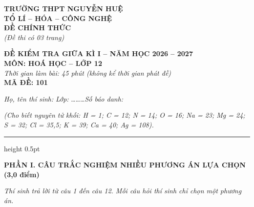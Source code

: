 \documentclass[11pt,a4paper]{article}
\begin{document}
\noindent
\begin{minipage}[t]{0.48\textwidth}
\textbf{TRƯỜNG THPT NGUYỄN HUỆ}\\
\textbf{TỔ LÍ -- HÓA -- CÔNG NGHỆ}\\
\textbf{ĐỀ CHÍNH THỨC}\\
\textit{(Đề thi có 03 trang)}
\end{minipage}
\hfill
\begin{minipage}[t]{0.48\textwidth}
\raggedleft
\textbf{\color{hfRed}ĐỀ KIỂM TRA GIỮA KÌ I -- NĂM HỌC 2026 -- 2027}\\
\textbf{MÔN: HOÁ HỌC -- LỚP 12}\\
\textit{Thời gian làm bài: 45 phút (không kể thời gian phát đề)}\\
\textbf{MÃ ĐỀ: 101}
\end{minipage}

\vspace{4pt}
\noindent
\textit{Họ, tên thí sinh:} \dotfill \textit{Lớp:} \dots\dots\dots \textit{Số báo danh:} \dotfill

\vspace{3pt}
\noindent
\textit{\footnotesize (Cho biết nguyên tử khối: H = 1; C = 12; N = 14; O = 16; Na = 23; Mg = 24; S = 32; Cl = 35,5; K = 39; Ca = 40; Ag = 108).}

\vspace{2pt}
\hrule height 0.5pt

\vspace{6pt}
\noindent
{\color{mainGreen}\textbf{\large PHẦN I. CÂU TRẮC NGHIỆM NHIỀU PHƯƠNG ÁN LỰA CHỌN (3,0 điểm)}}

\textit{Thí sinh trả lời từ câu 1 đến câu 12. Mỗi câu hỏi thí sinh chỉ chọn một phương án.}

\vspace{2pt}
\end{document}
